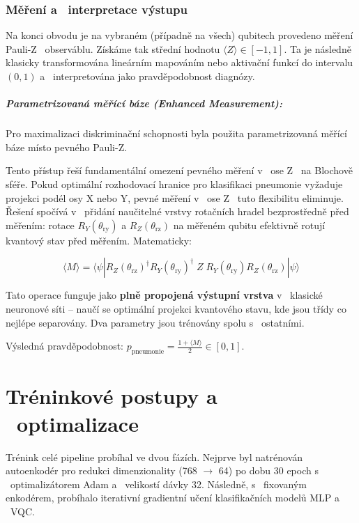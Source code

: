\documentclass[12pt, a4paper]{report}
\begin{document}
\subsubsection{Měření a ~interpretace výstupu}
Na konci obvodu je na vybraném (případně na všech) qubitech provedeno měření Pauli-Z ~observáblu. Získáme tak střední hodnotu $\langle Z \rangle \in [-1, 1]$. Ta je následně klasicky transformována lineárním mapováním nebo aktivační funkcí do intervalu $(0, 1)$ a ~interpretována jako pravděpodobnost diagnózy.

\subparagraph{Parametrizovaná měřící báze (Enhanced Measurement):}
Pro maximalizaci diskriminační schopnosti byla použita parametrizovaná měřící báze místo pevného Pauli-Z. 

Tento přístup řeší fundamentální omezení pevného měření v ~ose Z ~na Blochově sféře. Pokud optimální rozhodovací hranice pro klasifikaci pneumonie vyžaduje projekci podél osy X nebo Y, pevné měření v ~ose Z ~tuto flexibilitu eliminuje. Řešení spočívá v ~přidání naučitelné vrstvy rotačních hradel bezprostředně před měřením: rotace $R_Y(\theta_{\text{ry}})$ a $R_Z(\theta_{\text{rz}})$ na měřeném qubitu efektivně rotují kvantový stav před měřením. Matematicky:

\begin{equation}
    \langle M \rangle = \langle \psi | R_Z(\theta_{\text{rz}})^\dagger R_Y(\theta_{\text{ry}})^\dagger \; Z \; R_Y(\theta_{\text{ry}}) R_Z(\theta_{\text{rz}}) | \psi \rangle
\end{equation}

Tato operace funguje jako \textbf{plně propojená výstupní vrstva} v ~klasické neuronové síti -- naučí se optimální projekci kvantového stavu, kde jsou třídy co nejlépe separovány. Dva parametry jsou trénovány spolu s ~ostatními.

Výsledná pravděpodobnost: $p_{\text{pneumonie}} = \frac{1 + \langle M \rangle}{2} \in [0,1]$.

\section{Tréninkové postupy a ~optimalizace} \label{sec:training}

Trénink celé pipeline probíhal ve dvou fázích. Nejprve byl natrénován autoenkodér pro redukci dimenzionality (768 $\to$ 64) po dobu 30 epoch s ~optimalizátorem Adam a ~velikostí dávky 32. Následně, s ~fixovaným enkodérem, probíhalo iterativní gradientní učení klasifikačních modelů MLP a ~VQC.
\end{document}
